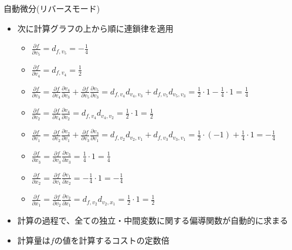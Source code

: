 \begin{frame}[t,fragile]{自動微分(リバースモード)}
  \begin{itemize}
  \item 次に計算グラフの上から順に連鎖律を適用
    \begin{itemize}
    \item $\frac{\partial f}{\partial v_5} = d_{f,v_5} = -\frac{1}{4}$
    \item $\frac{\partial f}{\partial v_4} = d_{f,v_4} = \frac{1}{2}$
    \item $\frac{\partial f}{\partial v_3} = \frac{\partial f}{\partial v_4} \frac{\partial v_4}{\partial v_3} +  \frac{\partial f}{\partial v_5} \frac{\partial v_5}{\partial v_3}  = d_{f,v_4} d_{v_4,v_3} + d_{f,v_5} d_{v_5,v_3} = \frac{1}{2} \cdot 1 -\frac{1}{4} \cdot 1 = \frac{1}{4}$
    \item $\frac{\partial f}{\partial v_2} = \frac{\partial f}{\partial v_4} \frac{\partial v_4}{\partial v_2} = d_{f,v_4} d_{v_4,v_2} =  \frac{1}{2} \cdot 1 = \frac{1}{2}$
    \item $\frac{\partial f}{\partial v_1} = \frac{\partial f}{\partial v_2} \frac{\partial v_2}{\partial v_1} +  \frac{\partial f}{\partial v_3} \frac{\partial v_3}{\partial v_1} = d_{f,v_2} d_{v_2,v_1} + d_{f,v_3} d_{v_3,v_1} = \frac{1}{2} \cdot (-1) + \frac{1}{4} \cdot 1 = -\frac{1}{4}$
    \item $\frac{\partial f}{\partial x_3} = \frac{\partial f}{\partial v_3} \frac{\partial v_3}{\partial x_3} = \frac{1}{4} \cdot 1 = \frac{1}{4}$
    \item $\frac{\partial f}{\partial x_2} = \frac{\partial f}{\partial v_1} \frac{\partial v_1}{\partial x_2} = -\frac{1}{4} \cdot 1 = -\frac{1}{4}$
    \item $\frac{\partial f}{\partial x_1} = \frac{\partial f}{\partial v_2} \frac{\partial v_2}{\partial x_1} = d_{f,v_2} d_{v_2,x_1} = \frac{1}{2} \cdot 1 = \frac{1}{2}$
    \end{itemize}
  \item 計算の過程で、全ての独立・中間変数に関する偏導関数が自動的に求まる
  \item 計算量は$f$の値を計算するコストの定数倍

  \end{itemize}
\end{frame}
